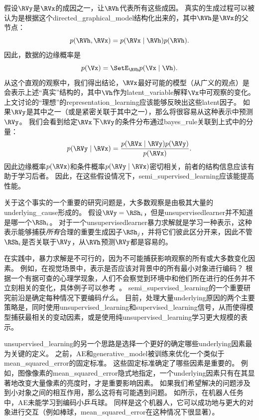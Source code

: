 假设$\RVy$是$\RVx$的成因之一，让$\RVh$代表所有这些成因。
真实的生成过程可以被认为是根据这个\gls{directed_graphical_model}结构化出来的，其中$\RVh$是$\RVx$的父节点：
\begin{equation}
	p(\RVh, \RVx) = p(\RVx \mid \RVh) p(\RVh).
\end{equation} %
因此，数据的边缘概率是
\begin{equation}
	p(\Vx) = \SetE_{\RVh} p(\Vx \mid \Vh).
\end{equation}
从这个直观的观察中，我们得出结论，$\RVx$最好可能的模型（从广义的观点）是会表示上述``真实''结构的，其中$\Vh$作为\gls{latent_variable}解释$\Vx$中可观察的变化。
上文讨论的``理想''的\gls{representation_learning}应该能够反映出这些\gls{latent}因子。
如果$\RVy$是其中之一（或是紧密关联于其中之一），那么将很容易从这种表示中预测$\RVy$。
我们会看到给定$\RVx$下$\RVy$的条件分布通过\gls{bayes_rule}关联到上式中的分量：
\begin{equation}
	p(\RVy \mid \RVx) = \frac{ p(\RVx \mid \RVy) p(\RVy) }{p(\RVx)}.
\end{equation}
因此边缘概率$p(\RVx)$和条件概率$p(\RVy \mid \RVx)$密切相关，前者的结构信息应该有助于学习后者。
因此，在这些假设情况下，\gls{semi_supervised_learning}应该能提高性能。


关于这个事实的一个重要的研究问题是，大多数观察是由极其大量的\gls{underlying_cause}形成的。
假设$\RVy = \RSh_i$，但是\gls{unsupervised}\gls{learner}并不知道是哪一个$\RSh_i$。
对于一个\gls{unsupervised}\gls{learner}暴力求解就是学习一种表示，这种表示能够捕获\emph{所有}合理的重要生成因子$\RSh_j$，并将它们彼此区分开来，因此不管$\RSh_i$是否关联于$\RVy$，从$\RVh$预测$\RVy$都是容易的。


在实践中，暴力求解是不可行的，因为不可能捕获影响观察的所有或大多数变化因素。
例如，在视觉场景中，表示是否应该对背景中的所有最小对象进行编码？
根据一个有据可查的心理学现象，人们不会察觉到环境中和他们所在进行的任务并不立刻相关的变化，具体例子可以参考~\cite{simons1998failure}。
\gls{semi_supervised_learning}的一个重要研究前沿是确定每种情况下要编码\emph{什么}。
目前，处理大量\gls{underlying}原因的两个主要策略是，同时使用\gls{unsupervised_learning}和\gls{supervised_learning}信号，从而使得模型捕获最相关的变动因素，或是使用纯\gls{unsupervised_learning}学习更大规模的表示。


\gls{unsupervised_learning}的另一个思路是选择一个更好的确定哪些\gls{underlying}因素最为关键的定义。
之前，\gls{AE}和\gls{generative_model}被训练来优化一个类似于\gls{mean_squared_error}的固定标准。
这些固定标准确定了哪些因素是重要的。
例如，图像像素的\gls{mean_squared_error}隐式地指定，一个\gls{underlying}因素只有在其显著地改变大量像素的亮度时，才是重要影响因素。
如果我们希望解决的问题涉及到小对象之间的相互作用，那么这将有可能遇到问题。
如所示，在机器人任务中，\gls{AE}未能学习到编码小乒乓球。
同样是这个机器人，它可以成功地与更大的对象进行交互（例如棒球，\gls{mean_squared_error}在这种情况下很显著）。

